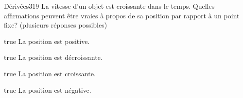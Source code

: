             \begin{question}{20}{Dérivées}{3}{19}
                La vitesse d'un objet est croissante dans le temps. Quelles affirmations peuvent être vraies à propos de sa position par rapport à un point fixe? (plusieurs réponses possibles)
            \end{question}
            \begin{reponses}
                \item[true] La position est positive.
                \item[true] La position est décroissante.
                \item[true] La position est croissante.
                \item[true] La position est négative.
            \end{reponses}
